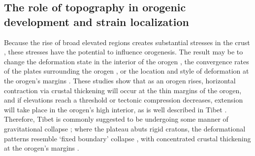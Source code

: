 \documentclass[draft,jgrga]{AGUTeX}
\begin{document}
\begin{article}
%

\subsection{The role of topography in orogenic development and strain
localization}\label{the-role-of-topography-in-orogenic-development-and-strain-localization}

Because the rise of broad elevated regions creates substantial stresses
in the crust \citep[e.g.,][]{jeffreys1924}, these stresses have the
potential to influence orogenesis. The result may be to change the deformation
state in the interior of the orogen \citep[e.g.,][]{dewey1988, molnar1988}, the
convergence rates of the plates surrounding the orogen \citep[e.g.][]
{meade2008}, or the location and style of deformation at the orogen's
margins \citep[e.g.,][]{beaumont2001, decelles2009}. These studies show that
as an orogen rises, horizontal contraction via crustal thickening will
occur at the thin margins of the orogen, and if elevations reach a
threshold or tectonic compression decreases, extension will take place
in the orogen's high interior, as is well described in Tibet
\citep[e.g.,][]{armijo1986, taylor2003, styron2015}. Therefore,
Tibet is commonly suggested to be undergoing some manner of
gravitational collapse \citep[e.g.,][]{england1989}; where the plateau abuts
rigid cratons, the deformational patterns resemble `fixed boundary'
collapse \citep{rey2001}, with concentrated crustal thickening at the
orogen's margins \citep[e.g.,][]{cook2008}.


\end{article}
\end{document}
